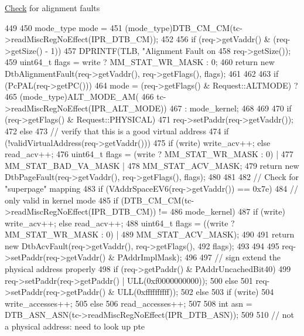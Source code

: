 \hyperlink{classCheck}{Check} for alignment faults


\begin{DoxyCode}
449 {
450     mode_type mode =
451         (mode_type)DTB_CM_CM(tc->readMiscRegNoEffect(IPR_DTB_CM));
452 
456     if (req->getVaddr() & (req->getSize() - 1)) {
457         DPRINTF(TLB, "Alignment Fault on %
458                 req->getSize());
459         uint64_t flags = write ? MM_STAT_WR_MASK : 0;
460         return new DtbAlignmentFault(req->getVaddr(), req->getFlags(), flags);
461     }
462 
463     if (PcPAL(req->getPC())) {
464         mode = (req->getFlags() & Request::ALTMODE) ?
465             (mode_type)ALT_MODE_AM(
466                 tc->readMiscRegNoEffect(IPR_ALT_MODE))
467             : mode_kernel;
468     }
469 
470     if (req->getFlags() & Request::PHYSICAL) {
471         req->setPaddr(req->getVaddr());
472     } else {
473         // verify that this is a good virtual address
474         if (!validVirtualAddress(req->getVaddr())) {
475             if (write) { write_acv++; } else { read_acv++; }
476             uint64_t flags = (write ? MM_STAT_WR_MASK : 0) |
477                 MM_STAT_BAD_VA_MASK |
478                 MM_STAT_ACV_MASK;
479             return new DtbPageFault(req->getVaddr(), req->getFlags(), flags);
480         }
481 
482         // Check for "superpage" mapping
483         if (VAddrSpaceEV6(req->getVaddr()) == 0x7e) {
484             // only valid in kernel mode
485             if (DTB_CM_CM(tc->readMiscRegNoEffect(IPR_DTB_CM)) !=
486                 mode_kernel) {
487                 if (write) { write_acv++; } else { read_acv++; }
488                 uint64_t flags = ((write ? MM_STAT_WR_MASK : 0) |
489                                   MM_STAT_ACV_MASK);
490 
491                 return new DtbAcvFault(req->getVaddr(), req->getFlags(),
492                                        flags);
493             }
494 
495             req->setPaddr(req->getVaddr() & PAddrImplMask);
496 
497             // sign extend the physical address properly
498             if (req->getPaddr() & PAddrUncachedBit40)
499                 req->setPaddr(req->getPaddr() | ULL(0xf0000000000));
500             else
501                 req->setPaddr(req->getPaddr() & ULL(0xffffffffff));
502         } else {
503             if (write)
504                 write_accesses++;
505             else
506                 read_accesses++;
507 
508             int asn = DTB_ASN_ASN(tc->readMiscRegNoEffect(IPR_DTB_ASN));
509 
510             // not a physical address: need to look up pte
}}}
\end{DoxyCode}
